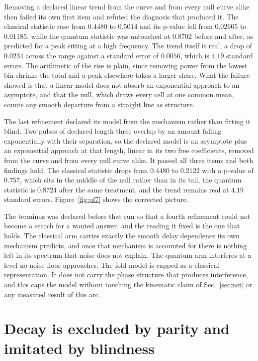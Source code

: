 \documentclass[aps,pre,reprint,nofootinbib,floatfix]{revtex4-2}
\begin{document}
Removing a declared linear trend from the curve and from every null
curve alike then failed its own first item and refuted the diagnosis
that produced it.  The classical statistic rose from $0.4480$ to
$0.5014$ and its p-value fell from $0.02605$ to $0.01185$, while the
quantum statistic was untouched at $0.8702$ before and after, as
predicted for a peak sitting at a high frequency.  The trend itself is
real, a drop of $0.0234$ across the range against a standard error of
$0.0056$, which is $4.19$ standard errors.  The arithmetic of the rise
is plain, since removing power from the lowest bin shrinks the total
and a peak elsewhere takes a larger share.  What the failure showed is
that a linear model does not absorb an exponential approach to an
asymptote, and that the null, which draws every cell at one common
mean, counts any smooth departure from a straight line as structure.

The last refinement declared its model from the mechanism rather than
fitting it blind.  Two pulses of declared length three overlap by an
amount falling exponentially with their separation, so the declared
model is an asymptote plus an exponential approach at that length,
linear in its two free coefficients, removed from the curve and from
every null curve alike.  It passed all three items and both findings
hold.  The classical statistic drops from $0.4480$ to $0.2122$ with a
p-value of $0.757$, which sits in the middle of the null rather than in
its tail, the quantum statistic is $0.8724$ after the same treatment,
and the trend remains real at $4.19$ standard errors.
Figure~\ref{fig:pf7} shows the corrected picture.

The terminus was declared before that run so that a fourth refinement
could not become a search for a wanted answer, and the reading it fixed
is the one that holds.  The classical arm carries exactly the smooth
delay dependence its own mechanism predicts, and once that mechanism is
accounted for there is nothing left in its spectrum that noise does not
explain.  The quantum arm interferes at a level no noise floor
approaches.  The fold model is capped as a classical representation.
It does not carry the phase structure that produces interference, and
this caps the model without touching the kinematic claim of
Sec.~\ref{sec:net} or any measured result of this arc.

\section{Decay is excluded by parity and imitated by blindness}
\label{sec:pf8}
\end{document}
